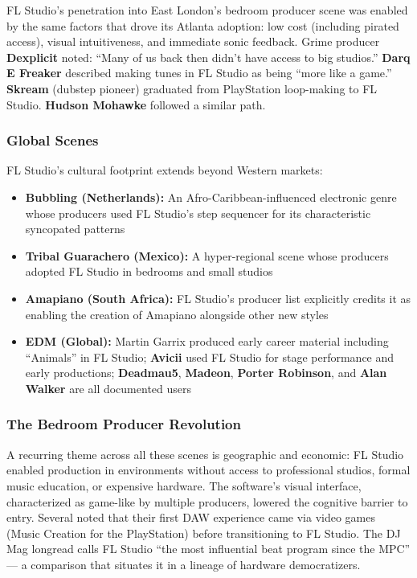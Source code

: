 \documentclass[11pt,letterpaper]{article}
\begin{document}
FL Studio's penetration into East London's bedroom producer scene was enabled by the same factors that drove its Atlanta adoption: low cost (including pirated access), visual intuitiveness, and immediate sonic feedback. Grime producer \textbf{Dexplicit} noted: ``Many of us back then didn't have access to big studios.'' \textbf{Darq E Freaker} described making tunes in FL Studio as being ``more like a game.'' \textbf{Skream} (dubstep pioneer) graduated from PlayStation loop-making to FL Studio. \textbf{Hudson Mohawke} followed a similar path.

\subsubsection{Global Scenes}

FL Studio's cultural footprint extends beyond Western markets:

\begin{itemize}[noitemsep]
  \item \textbf{Bubbling (Netherlands):} An Afro-Caribbean-influenced electronic genre whose producers used FL Studio's step sequencer for its characteristic syncopated patterns
  \item \textbf{Tribal Guarachero (Mexico):} A hyper-regional scene whose producers adopted FL Studio in bedrooms and small studios
  \item \textbf{Amapiano (South Africa):} FL Studio's producer list explicitly credits it as enabling the creation of Amapiano alongside other new styles
  \item \textbf{EDM (Global):} Martin Garrix produced early career material including ``Animals'' in FL Studio; \textbf{Avicii} used FL Studio for stage performance and early productions; \textbf{Deadmau5}, \textbf{Madeon}, \textbf{Porter Robinson}, and \textbf{Alan Walker} are all documented users
\end{itemize}

\subsubsection{The Bedroom Producer Revolution}

A recurring theme across all these scenes is geographic and economic: FL Studio enabled production in environments without access to professional studios, formal music education, or expensive hardware. The software's visual interface, characterized as game-like by multiple producers, lowered the cognitive barrier to entry. Several noted that their first DAW experience came via video games (Music Creation for the PlayStation) before transitioning to FL Studio. The DJ Mag longread calls FL Studio ``the most influential beat program since the MPC'' --- a comparison that situates it in a lineage of hardware democratizers.
\end{document}

